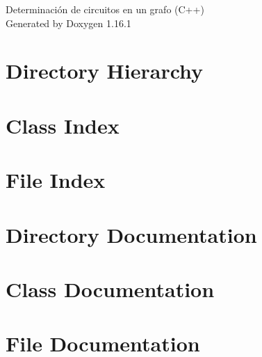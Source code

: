 \documentclass[twoside]{book}
\newcommand{\+}{\discretionary{\mbox{\scriptsize$\hookleftarrow$}}{}{}}
\newcommand{\clearemptydoublepage}{%
    \newpage{\pagestyle{empty}\cleardoublepage}%
  }
\begin{document}
  \raggedbottom
    \hypersetup{pageanchor=false,
                bookmarksnumbered=true,
                pdfencoding=unicode
               }
  \begin{titlepage}
  \vspace*{7cm}
  \begin{center}%
  {\Large Determinación de circuitos en un grafo (\+C++)}\\
  \vspace*{1cm}
  {\large Generated by Doxygen 1.16.1}\\
  \end{center}
  \end{titlepage}
  \clearemptydoublepage
  \tableofcontents
  \clearemptydoublepage
  \hypersetup{pageanchor=true}




\chapter{Directory Hierarchy}

\chapter{Class Index}

\chapter{File Index}

\chapter{Directory Documentation}


\chapter{Class Documentation}

\chapter{File Documentation}







  \backmatter
  \newpage
  \clearemptydoublepage
  \printindex
\end{document}
